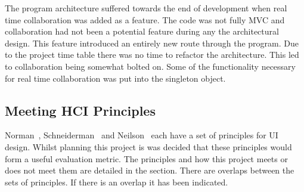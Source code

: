 The program architecture suffered towards the end of development when real time collaboration was added as a feature.  The code was not fully \ac{MVC} and collaboration had not been a potential feature during any the architectural design.  This feature introduced an entirely new route through the program.  Due to the project time table there was no time to refactor the architecture.  This led to collaboration being somewhat bolted on.  Some of the functionality necessary for real time collaboration was put into the singleton object.



\subsection{Meeting HCI Principles}

Norman~\cite{normsev}, Schneiderman~\cite{shgold} and Neilson~\cite{neilten} each have a set of principles for \ac{UI} design.  Whilst planning this project is was decided that these principles would form a useful evaluation metric.  The principles and how this project meets or does not meet them are detailed in the section.  There are overlaps between the sets of principles.  If there is an overlap it has been indicated.

